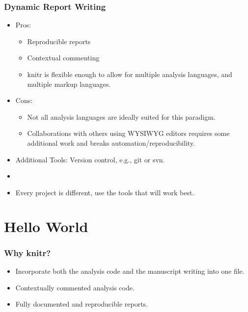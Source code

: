 \documentclass[t]{beamer}\usepackage[]{graphicx}\usepackage[]{color}
\begin{document}
\begin{frame} 
  \frametitle{Dynamic Report Writing}
  \begin{itemize}
    \item Pros: 
      \begin{itemize}
        \item Reproducible reports 
        \item Contextual commenting 
        \item knitr is flexible enough to allow for multiple analysis languages,
          and multiple markup languages.
      \end{itemize}
    \item Cons:
      \begin{itemize}
        \item Not all analysis languages are ideally suited for this paradigm.
        \item Collaborations with others using WYSIWYG editors requires some
          additional work and breaks automation/reproducibility.
      \end{itemize}
    \item Additional Tools: Version control, e.g., git or svn.
    \item[]
    \item Every project is different, use the tools that will work best.
  \end{itemize}
\end{frame}


\section{Hello World}
\begin{frame}
  \frametitle{Why knitr?}
  \begin{itemize}
    \item Incorporate both the analysis code and the manuscript writing into one
      file.
    \item Contextually commented analysis code.
    \item Fully documented and reproducible reports.
  \end{itemize}
\end{frame}
\end{document}
